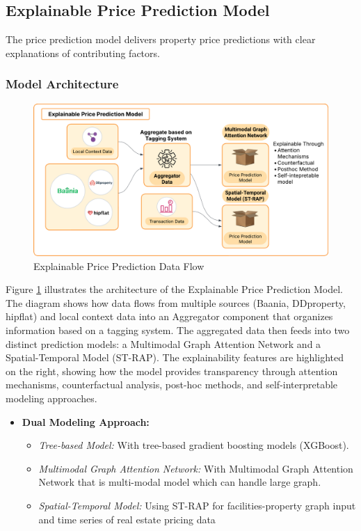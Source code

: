 \subsection{Explainable Price Prediction Model}
The price prediction model delivers property price predictions with clear explanations of contributing factors.

\subsubsection{Model Architecture}

\begin{figure}[htbp]
	\centering
	\includegraphics[width=1\textwidth]{assets/explainable-price-prediction-model.png}
	\caption{Explainable Price Prediction Data Flow}
	\label{fig:explainable-price-prediction-model-data-flow}
\end{figure}

\noindent Figure \ref{fig:explainable-price-prediction-model-data-flow} illustrates the architecture of the Explainable Price Prediction Model. The diagram shows how data flows from multiple sources (Baania, DDproperty, hipflat) and local context data into an Aggregator component that organizes information based on a tagging system. The aggregated data then feeds into two distinct prediction models: a Multimodal Graph Attention Network and a Spatial-Temporal Model (ST-RAP). The explainability features are highlighted on the right, showing how the model provides transparency through attention mechanisms, counterfactual analysis, post-hoc methods, and self-interpretable modeling approaches.

\begin{itemize}
    \item \textbf{Dual Modeling Approach:}
    \begin{itemize}
        \item \textit{Tree-based Model:} With tree-based gradient boosting models (XGBoost\cite{Chen_2016}).
        \item \textit{Multimodal Graph Attention Network:} With Multimodal Graph Attention Network\cite{veličković2018graphattentionnetworks} that is multi-modal model which can handle large graph.
        \item \textit{Spatial-Temporal Model:} Using ST-RAP\cite{ST-RAP} for facilities-property graph input and time series of real estate pricing data
    \end{itemize}
\end{itemize}

